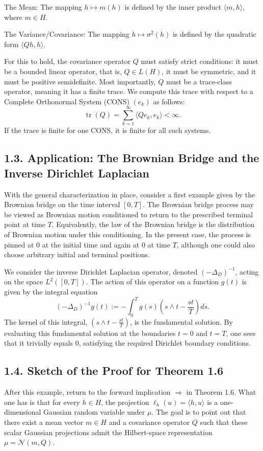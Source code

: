 \documentclass[11pt]{article}
\theoremstyle{definition}
\theoremstyle{remark}
\DeclareMathOperator{\tr}{tr}
\begin{document}
The Mean: The mapping $h\mapsto m(h)$ is defined by the inner product $\langle m,h\rangle$, where $m\in H$.

The Variance/Covariance: The mapping $h\mapsto \sigma^2(h)$ is defined by the quadratic form $\langle Qh,h\rangle$.

For this to hold, the covariance operator $Q$ must satisfy strict conditions: it must be a bounded linear operator, that is, $Q\in L(H)$, it must be symmetric, and it must be positive semidefinite. Most importantly, $Q$ must be a trace-class operator, meaning it has a finite trace. We compute this trace with respect to a Complete Orthonormal System (CONS) $(e_k)$ as follows:
\[
\tr(Q)=\sum_{k=1}^{\infty}\langle Qe_k,e_k\rangle<\infty.
\]
If the trace is finite for one CONS, it is finite for all such systems.

\subsection*{1.3. Application: The Brownian Bridge and the Inverse Dirichlet Laplacian}
With the general characterization in place, consider a first example given by the Brownian bridge on the time interval $[0,T]$.
The Brownian bridge process may be viewed as Brownian motion conditioned to return to the prescribed terminal point at time $T$. Equivalently, the law of the Brownian bridge is the distribution of Brownian motion under this conditioning. In the present case, the process is pinned at $0$ at the initial time and again at $0$ at time $T$, although one could also choose arbitrary initial and terminal positions.

We consider the inverse Dirichlet Laplacian operator, denoted $(-\Delta_D)^{-1}$, acting on the space $L^2([0,T])$. The action of this operator on a function $g(t)$ is given by the integral equation
\[
(-\Delta_D)^{-1}g(t):=-\int_0^T g(s)\left(s\wedge t-\frac{st}{T}\right)ds.
\]
The kernel of this integral, \(\left(s\wedge t-\frac{st}{T}\right)\), is the fundamental solution. By evaluating this fundamental solution at the boundaries $t=0$ and $t=T$, one sees that it trivially equals $0$, satisfying the required Dirichlet boundary conditions.

\subsection*{1.4. Sketch of the Proof for Theorem 1.6}
After this example, return to the forward implication \(\Rightarrow\) in Theorem 1.6.
What one has is that for every \(h\in H\), the projection \(\ell_h(u)=\langle h,u\rangle\) is a one-dimensional Gaussian random variable under \(\mu\). The goal is to point out that there exist a mean vector \(m\in H\) and a covariance operator \(Q\) such that these scalar Gaussian projections admit the Hilbert-space representation \(\mu=\mathcal N(m,Q)\).
\end{document}
